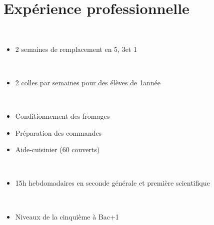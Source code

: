 \documentclass[]{cv-template}
\begin{document}
\begin{minipage}[t]{0.65\textwidth} 

\section{Expérience professionnelle}

 \\
\begin{itemize}
\item 2 semaines de remplacement en 5\ieme, 3\ieme et 1\iere
\end{itemize}
\sectionsep

 \\
\begin{itemize}
\item 2 colles par semaines pour des élèves de 1\iere année
\end{itemize}
\sectionsep

\\
\begin{itemize}
\item Conditionnement des fromages
\item Préparation des commandes
\item Aide-cuisinier (60 couverts)
\end{itemize}
\sectionsep

 \\
\begin{itemize}
\item 15h hebdomadaires en seconde générale et première scientifique
\end{itemize}
\sectionsep

\\
\position{}{}\vspace{-13pt}
\begin{itemize}
\item Niveaux de la cinquième à Bac+1
\end{itemize}
\sectionsep


\end{minipage}
\end{document}
